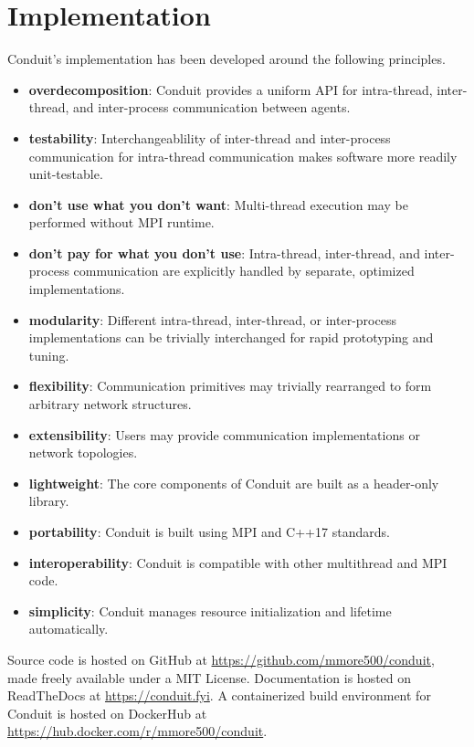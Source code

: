 \section{ Implementation }

Conduit's implementation has been developed around the following principles.

\begin{itemize}
    \item \textbf{overdecomposition}: Conduit provides a uniform API for intra-thread, inter-thread, and inter-process communication between agents.
    \item \textbf{testability}: Interchangeablility of inter-thread and inter-process communication for intra-thread communication makes software more readily unit-testable.
    \item \textbf{don't use what you don't want}: Multi-thread execution may be performed without MPI runtime.
    \item \textbf{don't pay for what you don't use}: Intra-thread, inter-thread, and inter-process communication are explicitly handled by separate, optimized implementations. 
    \item \textbf{modularity}: Different intra-thread, inter-thread, or inter-process implementations can be trivially interchanged for rapid prototyping and tuning.
    \item \textbf{flexibility}: Communication primitives may trivially rearranged to form arbitrary network structures. 
    \item \textbf{extensibility}: Users may provide communication implementations or network topologies.
    \item \textbf{lightweight}: The core components of Conduit are built as a header-only library.
    \item \textbf{portability}: Conduit is built using MPI and C++17 standards.
    \item \textbf{interoperability}: Conduit is compatible with other multithread and MPI code.
    \item \textbf{simplicity}: Conduit manages resource initialization and lifetime automatically.
\end{itemize}

Source code is hosted on GitHub at \url{https://github.com/mmore500/conduit}, made freely available under a MIT License.
Documentation is hosted on ReadTheDocs at \url{https://conduit.fyi}.
A containerized build environment for Conduit is hosted on DockerHub at \url{https://hub.docker.com/r/mmore500/conduit}.